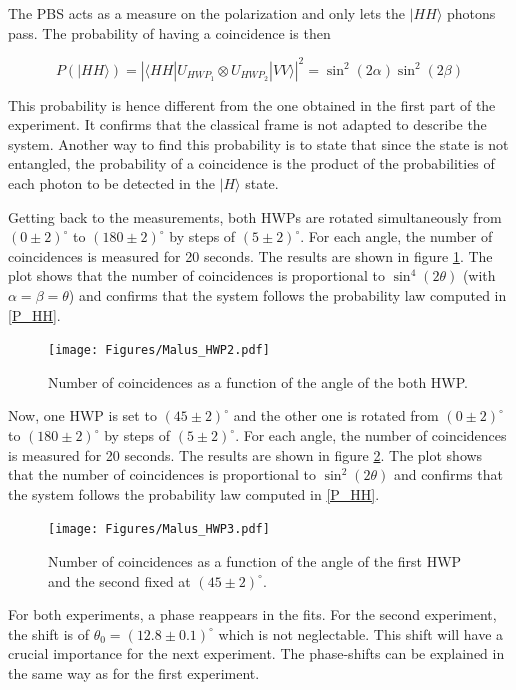 \documentclass[a4paper, 12pt,oneside]{article}
\begin{document}
The PBS acts as a measure on the polarization and only lets the $|HH\rangle$ photons pass. The probability of having a coincidence is then 

\begin{equation}
    P(|HH\rangle) = \left| \langle HH | U_{HWP_1} \otimes U_{HWP_2} |VV\rangle \right|^2 = \sin^2(2\alpha) \sin^2(2\beta)
    \label{P_HH}
\end{equation}

This probability is hence different from the one obtained in the first part of the experiment. It confirms that the classical frame is not adapted to describe the system. Another way to find this probability is to state that since the state is not entangled, the probability of a coincidence is the product of the probabilities of each photon to be detected in the $|H\rangle$ state.

Getting back to the measurements, both HWPs are rotated simultaneously from $(0\pm2)^{\circ}$ to $(180\pm2)^{\circ}$ by steps of $(5\pm2)^{\circ}$. For each angle, the number of coincidences is measured for 20 seconds. The results are shown in figure \ref{fig:Malus2}. The plot shows that the number of coincidences is proportional to $\sin^4(2\theta)$ (with $\alpha = \beta = \theta $) and confirms that the system follows the probability law computed in \eqref{P_HH}. 

\begin{figure}[H]
        \centering
        \texttt{[image: Figures/Malus\_HWP2.pdf]}
        \caption{Number of coincidences as a function of the angle of the both HWP.}
        \label{fig:Malus2}
\end{figure}

Now, one HWP is set to $(45\pm2)^{\circ}$ and the other one is rotated from $(0\pm2)^{\circ}$ to $(180\pm2)^{\circ}$ by steps of $(5\pm2)^{\circ}$. For each angle, the number of coincidences is measured for 20 seconds. The results are shown in figure \ref{fig:Malus3}. The plot shows that the number of coincidences is proportional to $\sin^2(2\theta)$ and confirms that the system follows the probability law computed in \eqref{P_HH}.
    
\begin{figure}[H]
        \centering
        \texttt{[image: Figures/Malus\_HWP3.pdf]}
        \caption{Number of coincidences as a function of the angle of the first HWP and the second fixed at $(45\pm2)^\circ$.}
        \label{fig:Malus3}
\end{figure}

For both experiments, a phase reappears in the fits. For the second experiment, the shift is of $\theta_0 = (12.8\pm0.1)^\circ$  which is not neglectable. This shift will have a crucial importance for the next experiment. The phase-shifts can be explained in the same way as for the first experiment. 
\end{document}
